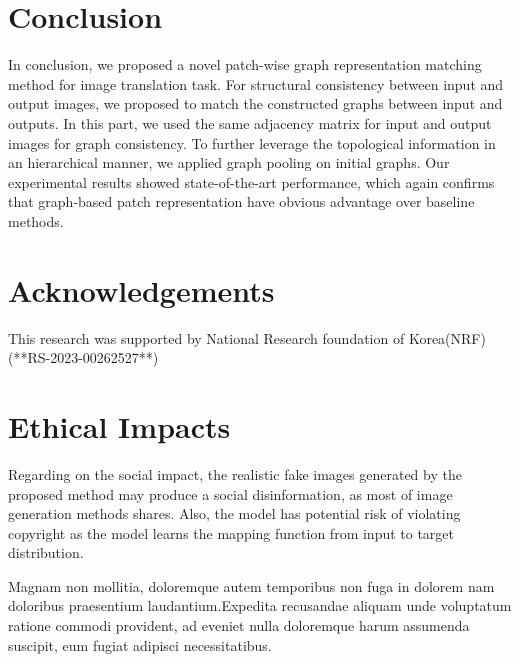 \documentclass[letterpaper]{article} %
\begin{document}
\section{Conclusion}
In conclusion, we proposed a novel patch-wise graph representation matching method for image translation task. For structural consistency between input and output images, we proposed to match the constructed graphs between input and outputs. In this part, we used the same adjacency matrix for input and output images for graph consistency. To further leverage the topological information in an hierarchical manner, we applied graph pooling on initial graphs. Our experimental results showed state-of-the-art performance, which again confirms that graph-based patch representation have obvious advantage over baseline methods.


\section{Acknowledgements}
This research was supported by National Research foundation of Korea(NRF) (**RS-2023-00262527**)

\section{Ethical Impacts}
Regarding on the social impact, the realistic fake images generated by the proposed method may produce a social disinformation, as most of image generation methods shares. Also, the model has potential risk of violating copyright as the model learns the mapping function from input to target distribution.


Magnam non mollitia, doloremque autem temporibus non fuga in dolorem nam doloribus praesentium laudantium.Expedita recusandae aliquam unde voluptatum ratione commodi provident, ad eveniet nulla doloremque harum assumenda suscipit, eum fugiat adipisci necessitatibus.\clearpage

\end{document}
